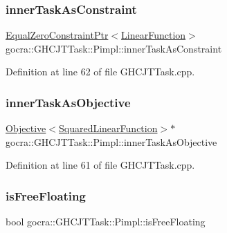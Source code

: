 \subsubsection{\texorpdfstring{inner\+Task\+As\+Constraint}{innerTaskAsConstraint}}
{\footnotesize\ttfamily \hyperlink{classocra_1_1EqualZeroConstraintPtr}{Equal\+Zero\+Constraint\+Ptr}$<$\hyperlink{classocra_1_1LinearFunction}{Linear\+Function}$>$ gocra\+::\+G\+H\+C\+J\+T\+Task\+::\+Pimpl\+::inner\+Task\+As\+Constraint}



Definition at line 62 of file G\+H\+C\+J\+T\+Task.\+cpp.

\hypertarget{structgocra_1_1GHCJTTask_1_1Pimpl_a43d0c542d4107893610d8d07cce2fdd0}{}\label{structgocra_1_1GHCJTTask_1_1Pimpl_a43d0c542d4107893610d8d07cce2fdd0} 
\subsubsection{\texorpdfstring{inner\+Task\+As\+Objective}{innerTaskAsObjective}}
{\footnotesize\ttfamily \hyperlink{classocra_1_1Objective}{Objective}$<$\hyperlink{classocra_1_1SquaredLinearFunction}{Squared\+Linear\+Function}$>$$\ast$ gocra\+::\+G\+H\+C\+J\+T\+Task\+::\+Pimpl\+::inner\+Task\+As\+Objective}



Definition at line 61 of file G\+H\+C\+J\+T\+Task.\+cpp.

\hypertarget{structgocra_1_1GHCJTTask_1_1Pimpl_a3fefbc36e9c5e9b8c4fc8f85fb19da53}{}\label{structgocra_1_1GHCJTTask_1_1Pimpl_a3fefbc36e9c5e9b8c4fc8f85fb19da53} 
\subsubsection{\texorpdfstring{is\+Free\+Floating}{isFreeFloating}}
{\footnotesize\ttfamily bool gocra\+::\+G\+H\+C\+J\+T\+Task\+::\+Pimpl\+::is\+Free\+Floating}



